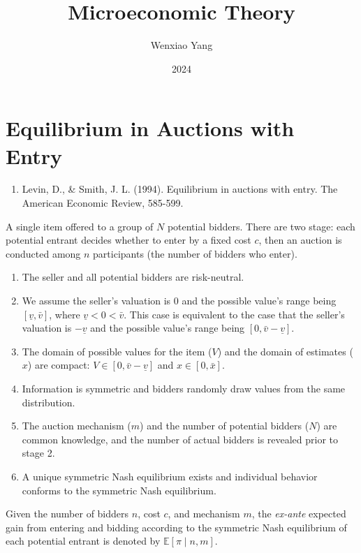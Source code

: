 \documentclass[11pt]{elegantbook}
\title{\textbf{Microeconomic Theory}}
\author{Wenxiao Yang}
\institute{Haas School of Business, University of California Berkeley}
\date{2024}
\begin{document}
\maketitle
\frontmatter
\mainmatter

\section{Equilibrium in Auctions with Entry}
\begin{enumerate}[$\circ$]
    \item Levin, D., \& Smith, J. L. (1994). Equilibrium in auctions with entry. The American Economic Review, 585-599.
\end{enumerate}
A single item offered to a group of $N$ potential bidders. There are two stage: each potential  entrant decides whether to enter by a fixed cost $c$, then an auction is conducted among $n$ participants (the number of bidders who enter).
\begin{assumption}
    \begin{enumerate}
        \item The seller and all potential bidders are risk-neutral.
        \item We assume the seller's valuation is $0$ and the possible value's range being $[\underline{v},\bar{v}]$, where $\underline{v}<0<\bar{v}$. This case is equivalent to the case that the seller's valuation is $-\underline{v}$ and the possible value's range being $[0,\bar{v}-\underline{v}]$.
        \item The domain of possible values for the item ($V$) and the domain of estimates ($x$) are compact: $V\in[0,\bar{v}-\underline{v}]$ and $x\in [0,\bar{x}]$.
        \item Information is symmetric and bidders randomly draw values from the same distribution.
        \item The auction mechanism ($m$) and the number of potential bidders ($N$) are common knowledge, and the number of actual bidders is revealed prior to stage 2.
        \item A unique symmetric Nash equilibrium exists and individual behavior conforms to the symmetric Nash equilibrium.
    \end{enumerate}
\end{assumption}

Given the number of bidders $n$, cost $c$, and mechanism $m$, the \textit{ex-ante} expected gain from entering and bidding according to the symmetric Nash equilibrium of each potential entrant is denoted by $\mathbb{E}[\pi\mid n,m]$.
\end{document}
